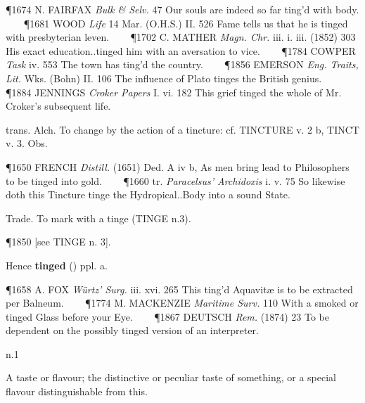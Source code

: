 \begin{description}[wide, labelwidth=!, labelindent=0pt]
\begin{myenumerate}
\P 1674 N. FAIRFAX  \textit{Bulk \& Selv.} 47 Our souls are indeed so far ting'd with body.    
\P 1681 WOOD  \textit{Life} 14 Mar. (O.H.S.) II. 526 Fame tells us that he is tinged with presbyterian leven.    
\P 1702 C. MATHER  \textit{Magn. Chr.} iii. i. iii. (1852) 303 His exact education..tinged him with an aversation to vice.    
\P 1784 COWPER  \textit{Task} iv. 553 The town has ting'd the country.    
\P 1856 EMERSON  \textit{Eng. Traits, Lit.} Wks. (Bohn) II. 106 The influence of Plato tinges the British genius.    
\P 1884 JENNINGS  \textit{Croker Papers} I. vi. 182 This grief tinged the whole of Mr. Croker's subsequent life.

 trans. Alch. To change by the action of a tincture: cf. TINCTURE v. 2 b, TINCT v. 3. Obs.

\P 1650 FRENCH  \textit{Distill.} (1651) Ded. A iv b, As men bring lead to Philosophers to be tinged into gold.    
\P 1660 tr.  \textit{Paracelsus' Archidoxis} i. v. 75 So likewise doth this Tincture tinge the Hydropical..Body into a sound State.

 Trade. To mark with a tinge (TINGE n.3).

\P 1850 [see TINGE n. 3].

\noindent Hence \textbf{tinged} () ppl. a.

\P 1658 A. FOX  \textit{Würtz' Surg.} iii. xvi. 265 This ting'd Aquavitæ is to be extracted per Balneum.    
\P 1774 M. MACKENZIE  \textit{Maritime Surv.} 110 With a smoked or tinged Glass before your Eye.    
\P 1867 DEUTSCH  \textit{Rem.} (1874) 23 To be dependent on the possibly tinged version of an interpreter.
\end{myenumerate}


 n.1

\noindent {}

\noindent [OE. smæc, = OFris. smek, MDu. smac, MLG. smak (LG. smakk, schmakk; also Sw. smak, Da. smag), OHG. and MHG. smac, smach (G. dial. schmack; cf. G. geschmack). Slightly different in formation are OFris. smaka (WFris. smaek), MDu. smake (Kilian smaeck; Du. smaak), MLG. smake (LG. smâk, schmaak). See also SMATCH n.1]
\vspace{-0.3cm}

\begin{myenumerate}

 A taste or flavour; the distinctive or peculiar taste of something, or a special flavour distinguishable from this.


\end{myenumerate}
\end{description}
